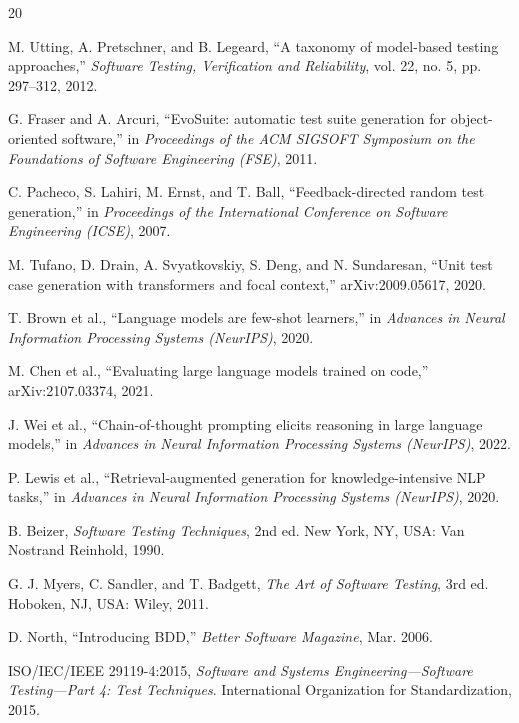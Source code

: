 \documentclass[conference]{IEEEtran}
\begin{document}
\begin{thebibliography}{20}

M. Utting, A. Pretschner, and B. Legeard, ``A taxonomy of model-based testing approaches,'' \textit{Software Testing, Verification and Reliability}, vol. 22, no. 5, pp. 297--312, 2012.

G. Fraser and A. Arcuri, ``EvoSuite: automatic test suite generation for object-oriented software,'' in \textit{Proceedings of the ACM SIGSOFT Symposium on the Foundations of Software Engineering (FSE)}, 2011.

C. Pacheco, S. Lahiri, M. Ernst, and T. Ball, ``Feedback-directed random test generation,'' in \textit{Proceedings of the International Conference on Software Engineering (ICSE)}, 2007.

M. Tufano, D. Drain, A. Svyatkovskiy, S. Deng, and N. Sundaresan, ``Unit test case generation with transformers and focal context,'' arXiv:2009.05617, 2020.

T. Brown et al., ``Language models are few-shot learners,'' in \textit{Advances in Neural Information Processing Systems (NeurIPS)}, 2020.

M. Chen et al., ``Evaluating large language models trained on code,'' arXiv:2107.03374, 2021.

J. Wei et al., ``Chain-of-thought prompting elicits reasoning in large language models,'' in \textit{Advances in Neural Information Processing Systems (NeurIPS)}, 2022.

P. Lewis et al., ``Retrieval-augmented generation for knowledge-intensive NLP tasks,'' in \textit{Advances in Neural Information Processing Systems (NeurIPS)}, 2020.

B. Beizer, \textit{Software Testing Techniques}, 2nd ed. New York, NY, USA: Van Nostrand Reinhold, 1990.

G. J. Myers, C. Sandler, and T. Badgett, \textit{The Art of Software Testing}, 3rd ed. Hoboken, NJ, USA: Wiley, 2011.

D. North, ``Introducing BDD,'' \textit{Better Software Magazine}, Mar. 2006.

ISO/IEC/IEEE 29119-4:2015, \textit{Software and Systems Engineering---Software Testing---Part 4: Test Techniques}. International Organization for Standardization, 2015.


\end{thebibliography}
\end{document}
